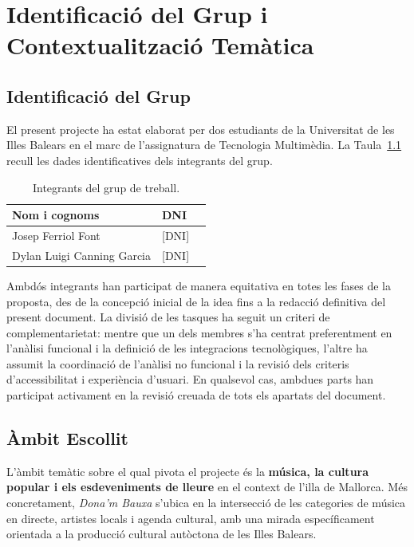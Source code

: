 \chapter{Identificació del Grup i Contextualització Temàtica}
\label{chapter:identificacio}

\section{Identificació del Grup}

El present projecte ha estat elaborat per dos estudiants de la Universitat de les Illes Balears en el marc de l'assignatura de Tecnologia Multimèdia. La Taula~\ref{tab:integrants} recull les dades identificatives dels integrants del grup.

\begin{table}[h]
\centering
\caption{Integrants del grup de treball.}
\label{tab:integrants}
\begin{tabular}{lll}
\toprule
\textbf{Nom i cognoms} & \textbf{DNI} \\
\midrule
Josep Ferriol Font         & {[DNI]} \\
Dylan Luigi Canning Garcia & {[DNI]} \\
\bottomrule
\end{tabular}
\end{table}

Ambdós integrants han participat de manera equitativa en totes les fases de la proposta, des de la concepció inicial de la idea fins a la redacció definitiva del present document. La divisió de les tasques ha seguit un criteri de complementarietat: mentre que un dels membres s'ha centrat preferentment en l'anàlisi funcional i la definició de les integracions tecnològiques, l'altre ha assumit la coordinació de l'anàlisi no funcional i la revisió dels criteris d'accessibilitat i experiència d'usuari. En qualsevol cas, ambdues parts han participat activament en la revisió creuada de tots els apartats del document.

\section{Àmbit Escollit}

L'àmbit temàtic sobre el qual pivota el projecte és la \textbf{música, la cultura popular i els esdeveniments de lleure} en el context de l'illa de Mallorca. Més concretament, \textit{Dona'm Bauxa} s'ubica en la intersecció de les categories de música en directe, artistes locals i agenda cultural, amb una mirada específicament orientada a la producció cultural autòctona de les Illes Balears.

